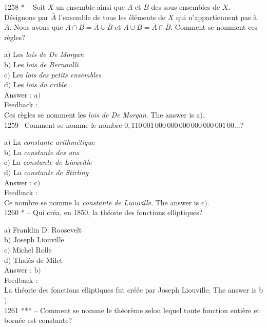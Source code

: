 \documentclass[letterpaper, 12pt]{article}
\begin{document}
1258 * -- Soit $X$ un ensemble ainsi que $A$ et $B$ des
sous-ensembles de $X$. D\'esignons par $\bar A$ l'ensemble de tous
les \'el\'ements de $X$ qui n'appartiennent pas \`a $A$. Nous avons
que $\overline{A\cap B}=\bar A\cup\bar B$ et $\overline{A\cup
B}=\bar A\cap\bar B$. Comment se nomment ces r\`egles?

a$)$ Les {\sl lois de De Morgan} \\
b$)$ Les {\sl lois de Bernoulli} \\
c$)$ Les {\sl lois des petits ensembles} \\
d$)$ Les {\sl lois du crible}\\

Answer : a$)$\\

Feedback : \\
Ces r\`egles se nomment les {\sl lois de De Morgan}.
The answer is a$)$.\\

1259-- Comment se nomme le nombre
$0,110\,001\,000\,000\,000\,000\,000\,001\,00\ldots$?

a$)$ La {\sl constante arithm\'etique} \\
b$)$ La {\sl constante des uns} \\
c$)$ La {\sl constante de Liouville} \\
d$)$ La {\sl constante de Stirling}\\

Answer : c$)$\\

Feedback : \\
Ce nombre se nomme la {\sl constante de Liouville}.
The answer is c$)$.\\

1260 * -- Qui cr\'ea, en 1850, la th\'eorie des fonctions
elliptiques?

a$)$ Franklin D. Roosevelt \\
b$)$ Joseph Liouville \\
c$)$ Michel Rolle \\
d$)$ Thal\`es de Milet\\

Answer : b$)$\\

Feedback : \\
La th\'eorie des fonctions elliptiques fut cr\'e\'ee par Joseph
Liouville.
The answer is b$)$.\\

1261 *** -- Comment se nomme le th\'eor\`eme selon lequel toute
fonction enti\`ere et born\'ee est constante?
\end{document}
